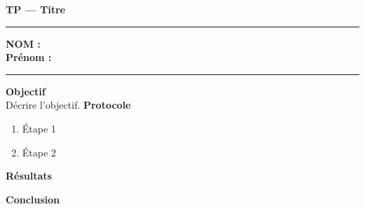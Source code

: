 \documentclass[11pt,a4paper]{article}
\newcommand{\cadreblanc}[1]{\medskip\framebox[\linewidth][c]{\rule{0mm}{#1mm}}\par\medskip}
\begin{document}
\begin{center}\LARGE\textbf{TP --- Titre}\end{center}
\vspace{2mm}\hrule\vspace{4mm}
\textbf{NOM :\\ Prénom :\\[2mm]}\hrule\vspace{4mm}
 \textbf{Objectif}\\[3mm]
Décrire l'objectif.\vspace{5mm}
 \textbf{Protocole}
\begin{enumerate}\item Étape 1\item Étape 2\end{enumerate}
 \textbf{Résultats}\cadreblanc{35}
 \textbf{Conclusion}\cadreblanc{25}
\end{document}
